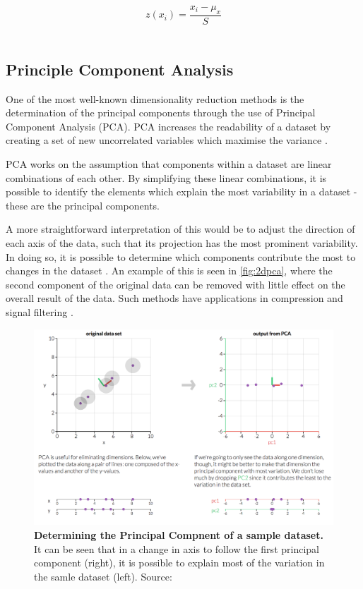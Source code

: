 \begin{equation}
    z(x_i) = \frac{x_i - \mu_x}{S}
    \label{eqn:z}
\end{equation}\\


\subsection{Principle Component Analysis}
One of the most well-known dimensionality reduction methods is the determination of the principal components through the use of Principal Component Analysis (PCA). PCA increases the readability of a dataset by creating a set of new uncorrelated variables which maximise the variance \citep{pcareview}.


 PCA works on the assumption that components within a dataset are linear combinations of each other. By simplifying these linear combinations, it is possible to identify the elements which explain the most variability in a dataset - these are the principal components.

A more straightforward interpretation of this would be to adjust the direction of each axis of the data, such that its projection has the most prominent variability. In doing so, it is possible to determine which components contribute the most to changes in the dataset \citep{pca,pca2}. An example of this is seen in \autoref{fig:2dpca}, where the second component of the original data can be removed with little effect on the overall result of the data. Such methods have applications in compression and signal filtering \citep{pcacompress,pcanoise}.


\begin{figure}[H]
    \centering
    \includegraphics[width=.8\textwidth]{./4fig/pca2d.png}
    \caption{\textbf{Determining the Principal Compnent of a sample dataset.} It can be seen that in a change in axis to follow the first principal component (right), it is possible to explain most of the variation in the samle dataset (left). Source: \citep{pcaim}}
    \label{fig:2dpca}
\end{figure}


